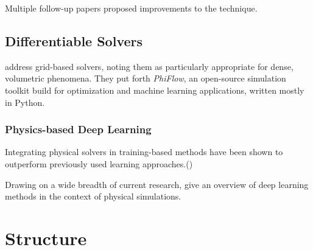Multiple follow-up papers proposed improvements to the technique.


\subsection{Differentiable Solvers}
\cite{holl2019pdecontrol} address grid-based solvers, noting them as
particularly appropriate for dense, volumetric phenomena. They put forth
\textit{PhiFlow}, an open-source simulation toolkit build for optimization and
machine learning applications, written mostly in Python.


\subsubsection*{Physics-based Deep Learning}
Integrating physical solvers in training-based methods have been shown to
outperform previously used learning approaches.(\cite{solver-in-the-loop})

Drawing on a wide breadth of current research, \cite{pbdl} give an overview of
deep learning methods in the context of physical simulations. 



\section{Structure}
